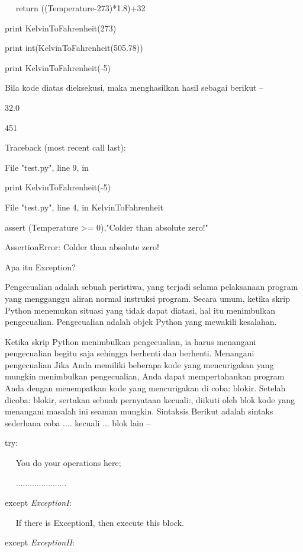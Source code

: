 ~~ return ((Temperature-273)*1.8)+32 

print KelvinToFahrenheit(273) 

print int(KelvinToFahrenheit(505.78)) 

print KelvinToFahrenheit(-5) 
\vspace{14pt}

Bila kode diatas dieksekusi, maka menghasilkan hasil sebagai berikut – 
\vspace{12pt}

32.0 

451 

Traceback (most recent call last): 

File "test.py", line 9, in  

print KelvinToFahrenheit(-5) 

File "test.py", line 4, in KelvinToFahrenheit

assert (Temperature >= 0),"Colder than absolute zero!" 

AssertionError: Colder than absolute zero! 
\vspace{12pt}

Apa itu Exception? 

Pengecualian adalah sebuah peristiwa, yang terjadi selama pelaksanaan program yang mengganggu aliran normal instruksi program. Secara umum, ketika skrip Python menemukan situasi yang tidak dapat diatasi, hal itu menimbulkan pengecualian. Pengecualian adalah objek Python yang mewakili kesalahan. 
\vspace{12pt}

Ketika skrip Python menimbulkan pengecualian, ia harus menangani pengecualian begitu saja sehingga berhenti dan berhenti. Menangani pengecualian Jika Anda memiliki beberapa kode yang mencurigakan yang mungkin menimbulkan pengecualian, Anda dapat mempertahankan program Anda dengan menempatkan kode yang mencurigakan di coba: blokir. Setelah dicoba: blokir, sertakan sebuah pernyataan kecuali:, diikuti oleh blok kode yang menangani masalah ini seaman mungkin. Sintaksis Berikut adalah sintaks sederhana coba .... kecuali ... blok lain – 
\vspace{12pt}

try: 

~~ You do your operations here; 

~~ ...................... 

except \textit{ExceptionI}: 

~~ If there is ExceptionI, then execute this block. 

except \textit{ExceptionII}: 


